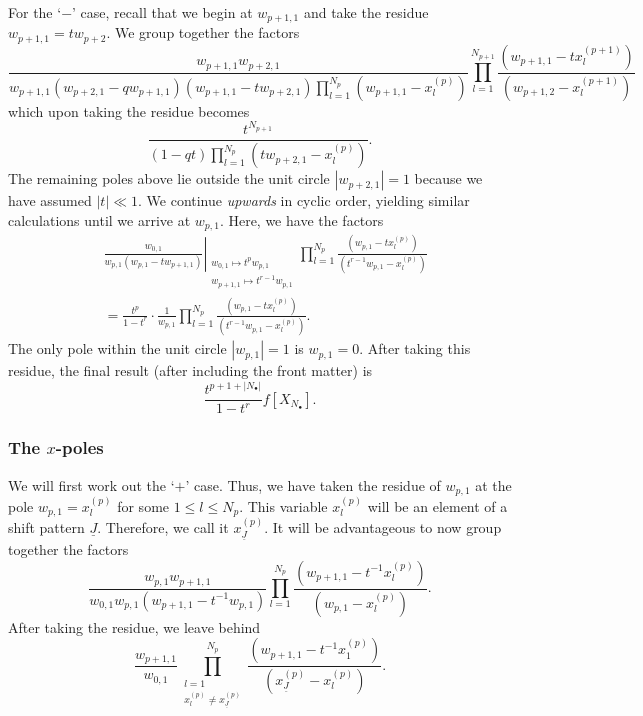 \documentclass{amsart}
\newcommand{\Ju}{{\underline{J}}}
\theoremstyle{remark}
\numberwithin{thm}{section}
\numberwithin{equation}{section}
\begin{document}
For the `$-$' case, recall that we begin at $w_{p+1,1}$ and take the residue $w_{p+1,1}=tw_{p+2}$.
We group together the factors
\[
\frac{w_{p+1,1}w_{p+2,1}}{w_{p+1,1}\left( w_{p+2,1}-qw_{p+1,1} \right)\left( w_{p+1,1}-tw_{p+2,1} \right)
\displaystyle
\prod_{l=1}^{N_p}\left( w_{p+1,1}-x_{l}^{(p)} \right)}
\prod_{l=1}^{N_{p+1}}
\frac{\left( w_{p+1,1}-tx_{l}^{(p+1)} \right)}
{\left( w_{p+1,2}-x_{l}^{(p+1)} \right)}
\]
which upon taking the residue becomes
\[
\frac{t^{N_{p+1}}}{\left( 1-qt \right)
\displaystyle
\prod_{l=1}^{N_p}\left( tw_{p+2,1}-x_{l}^{(p)} \right)}.
\]
The remaining poles above lie outside the unit circle $|w_{p+2,1}|=1$ because we have assumed $|t|\ll 1$.
We continue \textit{upwards} in cyclic order, yielding similar calculations until we arrive at $w_{p,1}$.
Here, we have the factors
\begin{align*}
&\left.\frac{w_{0,1}}
{w_{p,1}\left( w_{p,1}-tw_{p+1,1} \right)}\right|_{\substack{w_{0,1}\mapsto t^p w_{p,1}\\w_{p+1,1}\mapsto t^{r-1}w_{p,1}}}
\prod_{l=1}^{N_p}
\frac{\left( w_{p,1}-tx_{l}^{(p)} \right)}
{\left( t^{r-1}w_{p,1}-x_{l}^{(p)} \right)}\\
&= \frac{t^p}{1-t^r}
\cdot \frac{1}{w_{p,1}}
\prod_{l=1}^{N_p}
\frac{\left( w_{p,1}-tx_{l}^{(p)} \right)}
{\left( t^{r-1}w_{p,1}-x_{l}^{(p)} \right)}.
\end{align*}
The only pole within the unit circle $|w_{p,1}|=1$ is $w_{p,1}=0$.
After taking this residue, the final result (after including the front matter) is
\begin{equation*}
\frac{t^{p+1+|N_\bullet|}}{1-t^r}f\left[ X_{N_\bullet} \right].
\end{equation*}

\subsubsection{The $x$-poles}\label{XPole1}
We will first work out the `$+$' case.
Thus, we have taken the residue of $w_{p,1}$ at the pole $w_{p,1}=x_{l}^{(p)}$ for some $1\le l \le N_p$.
This variable $x_{l}^{(p)}$ will be an element of a shift pattern $\Ju$.
Therefore, we call it $x_{\Ju}^{(p)}$.
It will be advantageous to now group together the factors
\[
\frac{\displaystyle w_{p,1}w_{p+1,1}}
{w_{0,1}w_{p,1}\left( w_{p+1,1}-t^{-1}w_{p,1} \right)}
\prod_{l=1}^{N_{p}}
\frac{\left( w_{p+1,1}-t^{-1}x_{l}^{(p)} \right)}
{\left( w_{p,1}-x_{l}^{(p)} \right)}.
\]
After taking the residue, we leave behind
\[
\frac{w_{p+1,1}}{w_{0,1}}
\prod_{\substack{l=1\\x_{l}^{(p)}\not=x_{\Ju}^{(p)}}}^{N_{p}}
\frac{\left( w_{p+1,1}-t^{-1}x_{1}^{(p)} \right)}
{\left( x_{\Ju}^{(p)}-x_{l}^{(p)} \right)}.
\]
\end{document}
